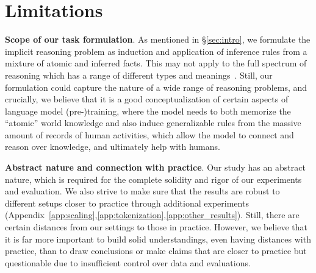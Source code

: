 \section*{Limitations}
\label{app:limitations}

\noindent\textbf{Scope of our task formulation}. As mentioned in \S\ref{sec:intro}, we formulate the implicit reasoning problem as induction and application of inference rules from a mixture of atomic and inferred facts. This may not apply to the full spectrum of reasoning which has a range of different types and meanings~\citep{huang-chang-2023-towards}. Still, our formulation could capture the nature of a wide range of reasoning problems, and crucially, we believe that it is a good conceptualization of certain aspects of language model (pre-)training, where the model needs to both memorize the ``atomic'' world knowledge and also induce generalizable rules from the massive amount of records of human activities, which allow the model to connect and reason over knowledge, and ultimately help with humans.

\noindent\textbf{Abstract nature and connection with practice}. Our study has an abstract nature, which is required for the complete solidity and rigor of our experiments and evaluation. We also strive to make sure that the results are robust to different setups closer to practice through additional experiments (Appendix~\ref{app:scaling},\ref{app:tokenization},\ref{app:other_results}). Still, there are certain distances from our settings to those in practice. However, we believe that it is far more important to build solid understandings, even having distances with practice, than to draw conclusions or make claims that are closer to practice but questionable due to insufficient control over data and evaluations.